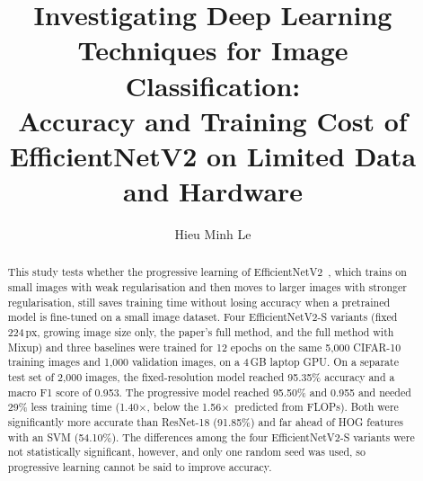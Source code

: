 \documentclass{COMPXXXX}
\newcommand{\sx}{$\times$}
\begin{document}
\title{Investigating Deep Learning Techniques for Image Classification:\\
	Accuracy and Training Cost of EfficientNetV2 on Limited Data and Hardware}

\author{Hieu Minh Le}

\maketitle


\begin{abstract}
This study tests whether the progressive learning of EfficientNetV2~\cite{tan2021efficientnetv2},
which trains on small images with weak regularisation and then moves to larger images with stronger
regularisation, still saves training time without losing accuracy when a pretrained model is
fine-tuned on a small image dataset. Four EfficientNetV2-S variants (fixed 224\,px, growing image size
only, the paper's full method, and the full method with Mixup) and three baselines were trained for 12
epochs on the same 5{,}000 CIFAR-10 training images and 1{,}000 validation images, on a 4\,GB laptop
GPU. On a separate test set of 2{,}000 images, the fixed-resolution model reached 95.35\% accuracy and
a macro F1 score of 0.953. The progressive model reached 95.50\% and 0.955 and needed 29\% less
training time (1.40\sx, below the 1.56\sx\ predicted from FLOPs). Both were significantly more accurate
than ResNet-18 (91.85\%) and far ahead of HOG features with an SVM (54.10\%). The differences among the
four EfficientNetV2-S variants were not statistically significant, however, and only one random seed
was used, so progressive learning cannot be said to improve accuracy.
\end{abstract}

\noindent{}
\end{document}

